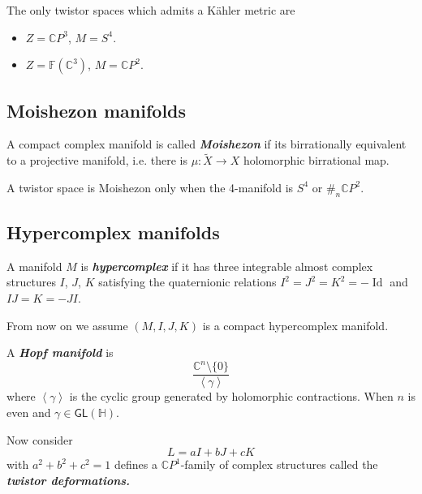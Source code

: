 \begin{thm}[N. Hitchin]\leavevmode
	The only twistor spaces which admits a Kähler metric are
	\begin{itemize}
	\item $Z=\mathbb{C}P^{3}$, $M=S^4$.
	\item $Z=\mathbb{F}(\mathbb{C}^3)$, $M=\mathbb{C}P^{2}$.
	\end{itemize}
\end{thm}

\subsection{Moishezon manifolds}

\begin{defn}\leavevmode
	A compact complex manifold is called \textit{\textbf{Moishezon}} if its birrationally equivalent to a projective manifold, i.e. there is  $\mu:\tilde{X}\to  X$ holomorphic birrational map.
\end{defn}

\begin{thm}[F. Campana]\leavevmode
	A twistor space is Moishezon only when the 4-manifold is $S^4$ or $\#_n\mathbb{C}P^{2}$.
\end{thm}

\subsection{Hypercomplex manifolds}

\begin{defn}\leavevmode
	A manifold $M$ is \textit{\textbf{hypercomplex}} if it has three integrable almost complex structures  $I$,  $J$, $K$ satisfying the quaternionic relations $I^2=J^2=K^2=-\operatorname{Id}$ and $I J=K=-J I$.
\end{defn}

From now on we assume $(M,I,J,K)$ is a compact hypercomplex manifold.

\begin{example}\leavevmode
	A \textit{\textbf{Hopf manifold }} is
	\[\dfrac{\mathbb{C}^n\setminus \{0\}}{\left<\gamma\right> }\]
	where $\left<\gamma\right> $ is the cyclic group generated by holomorphic contractions. When $n$ is even and $\gamma\in\mathsf{GL}(\mathbb{H})$.
\end{example}

Now consider 
\[L=a I+b J + c K \]
with $a^2+b^2+c^2=1$ defines a $\mathbb{C}P^{1}$-family of complex structures called the \textit{\textbf{twistor deformations.}}

